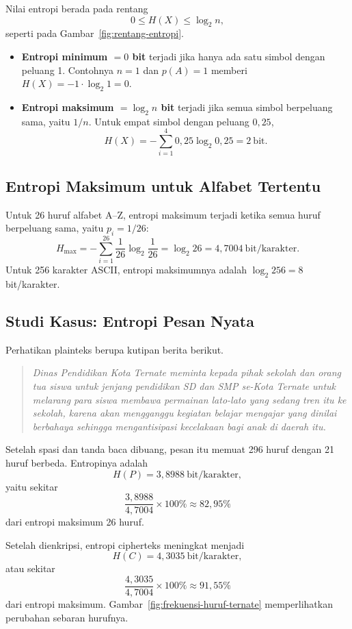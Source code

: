 Nilai entropi berada pada rentang
\[
    0 \le H(X) \le \log_2 n,
\]
seperti pada Gambar~\ref{fig:rentang-entropi}.
\begin{itemize}
    \item \textbf{Entropi minimum $= 0$ bit} terjadi jika hanya ada satu simbol
          dengan peluang 1. Contohnya $n=1$ dan $p(A)=1$ memberi
          $H(X) = -1 \cdot \log_2 1 = 0$.
    \item \textbf{Entropi maksimum $= \log_2 n$ bit} terjadi jika semua simbol
          berpeluang sama, yaitu $1/n$. Untuk empat simbol dengan peluang $0{,}25$,
          \[ H(X) = -\sum_{i=1}^{4} 0{,}25 \log_2 0{,}25 = 2\ \text{bit}. \]
\end{itemize}



\subsection{Entropi Maksimum untuk Alfabet Tertentu}

Untuk 26 huruf alfabet A--Z, entropi maksimum terjadi ketika semua huruf
berpeluang sama, yaitu $p_i = 1/26$:
\[
    H_{\max} = -\sum_{i=1}^{26} \frac{1}{26} \log_2 \frac{1}{26}
             = \log_2 26 = 4{,}7004\ \text{bit/karakter}.
\]
Untuk 256 karakter ASCII, entropi maksimumnya adalah $\log_2 256 = 8$
bit/karakter.

\subsection{Studi Kasus: Entropi Pesan Nyata}

Perhatikan plainteks berupa kutipan berita berikut.
\begin{quote}
\itshape
Dinas Pendidikan Kota Ternate meminta kepada pihak sekolah dan orang tua siswa
untuk jenjang pendidikan SD dan SMP se-Kota Ternate untuk melarang para siswa
membawa permainan lato-lato yang sedang tren itu ke sekolah, karena akan
mengganggu kegiatan belajar mengajar yang dinilai berbahaya sehingga
mengantisipasi kecelakaan bagi anak di daerah itu.
\end{quote}

Setelah spasi dan tanda baca dibuang, pesan itu memuat 296 huruf dengan 21 huruf
berbeda. Entropinya adalah
\[ H(P) = 3{,}8988\ \text{bit/karakter}, \]
yaitu sekitar
\[ \frac{3{,}8988}{4{,}7004} \times 100\% \approx 82{,}95\% \]
dari entropi maksimum 26 huruf.

Setelah dienkripsi, entropi cipherteks meningkat menjadi
\[ H(C) = 4{,}3035\ \text{bit/karakter}, \]
atau sekitar
\[ \frac{4{,}3035}{4{,}7004} \times 100\% \approx 91{,}55\% \]
dari entropi maksimum. Gambar~\ref{fig:frekuensi-huruf-ternate} memperlihatkan
perubahan sebaran hurufnya.

